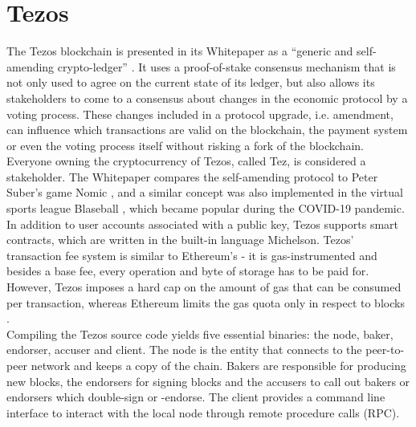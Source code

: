 \chapter{Tezos}
The Tezos blockchain is presented in its Whitepaper as a \enquote{generic and self-amending crypto-ledger} \cite{goodman_tezos_2014}. It uses a proof-of-stake consensus mechanism that is not only used to agree on the current state of its ledger, but also allows its stakeholders to come to a consensus about changes in the economic protocol by a voting process. These changes included in a protocol upgrade, i.e. amendment, can influence which transactions are valid on the blockchain, the payment system or even the voting process itself without risking a fork of the blockchain. Everyone owning the cryptocurrency of Tezos, called Tez, is considered a stakeholder. The Whitepaper compares the self-amending protocol to Peter Suber's game Nomic \cite{nomic}, and a similar concept was also implemented in the virtual sports league Blaseball \cite{blaseball}, which became popular during the COVID-19 pandemic. In addition to user accounts associated with a public key, Tezos supports smart contracts, which are written in the built-in language Michelson. Tezos' transaction fee system is similar to Ethereum's - it is gas-instrumented and besides a base fee, every operation and byte of storage has to be paid for. However, Tezos imposes a hard cap on the amount of gas that can be consumed per transaction, whereas Ethereum limits the gas quota only in respect to blocks \cite{wood_ethereum_2021}.\\
Compiling the Tezos source code yields five essential binaries: the node, baker, endorser, accuser and client. The node is the entity that connects to the peer-to-peer network and keeps a copy of the chain. Bakers are responsible for producing new blocks, the endorsers for signing blocks and the accusers to call out bakers or endorsers which double-sign or -endorse. The client provides a command line interface to interact with the local node through remote procedure calls (RPC).

